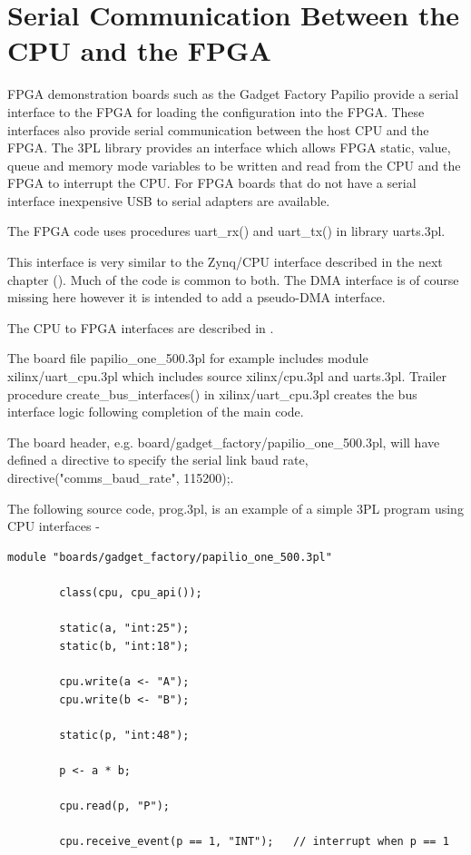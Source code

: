 \pagebreak

\chapter{Serial Communication Between the CPU and the FPGA}\label{ch:serialcpu}

    FPGA demonstration boards such as the Gadget Factory Papilio provide a serial
    interface to the FPGA for loading the configuration into the FPGA. These
    interfaces also provide serial communication between the host CPU and the
    FPGA. The 3PL library provides an interface which allows FPGA static, value,
    queue and memory mode variables to be written and read from the CPU and the
    FPGA to interrupt the CPU. For FPGA boards that do not have a serial
    interface inexpensive USB to serial adapters are available.
    
    The FPGA code uses procedures uart\_rx() and uart\_tx() in library uarts.3pl.
    
    This interface is very similar to the Zynq/CPU interface described in the
    next chapter (). Much of the code is common to
    both. The DMA interface is of course missing here however it is intended
    to add a pseudo-DMA interface.
    
    The CPU to FPGA interfaces are described in .
    
    The board file papilio\_one\_500.3pl for example includes module
    xilinx/uart\_cpu.3pl which includes source xilinx/cpu.3pl and uarts.3pl.
    Trailer procedure create\_bus\_interfaces() in xilinx/uart\_cpu.3pl creates the
    bus interface logic following completion of the main code. 
        
    The board header, e.g. board/gadget\_factory/papilio\_one\_500.3pl,
    will have defined a directive to specify the serial link baud rate,
    directive("comms\_baud\_rate", 115200);.
    
    The following source code, prog.3pl, is an example of a simple 3PL program
    using CPU interfaces -
    
    \begin{lstlisting}[gobble=4, language=threepl]
        module "boards/gadget_factory/papilio_one_500.3pl"
        
        class(cpu, cpu_api());

        static(a, "int:25");
        static(b, "int:18");

        cpu.write(a <- "A");
        cpu.write(b <- "B");

        static(p, "int:48");

        p <- a * b;

        cpu.read(p, "P");

        cpu.receive_event(p == 1, "INT");   // interrupt when p == 1
    \end{lstlisting}
    

